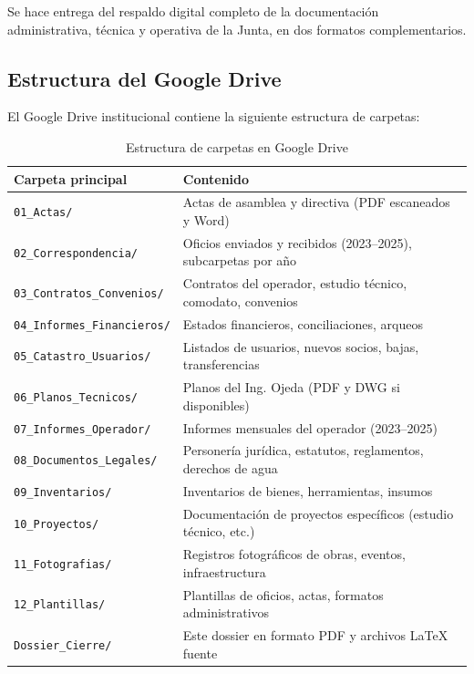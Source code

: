 Se hace entrega del respaldo digital completo de la documentación administrativa, técnica y operativa de la Junta, en dos formatos complementarios.

\subsection*{Estructura del Google Drive}

El Google Drive institucional contiene la siguiente estructura de carpetas:

\begin{table}[H]
\centering
\caption{Estructura de carpetas en Google Drive}
\label{tab:estructura-drive}
\begin{tabularx}{\textwidth}{@{}lX@{}}
\toprule
\textbf{Carpeta principal} & \textbf{Contenido} \\
\midrule
\texttt{01\_Actas/} & Actas de asamblea y directiva (PDF escaneados y Word) \\
\texttt{02\_Correspondencia/} & Oficios enviados y recibidos (2023--2025), subcarpetas por año \\
\texttt{03\_Contratos\_Convenios/} & Contratos del operador, estudio técnico, comodato, convenios \\
\texttt{04\_Informes\_Financieros/} & Estados financieros, conciliaciones, arqueos \\
\texttt{05\_Catastro\_Usuarios/} & Listados de usuarios, nuevos socios, bajas, transferencias \\
\texttt{06\_Planos\_Tecnicos/} & Planos del Ing. Ojeda (PDF y DWG si disponibles) \\
\texttt{07\_Informes\_Operador/} & Informes mensuales del operador (2023--2025) \\
\texttt{08\_Documentos\_Legales/} & Personería jurídica, estatutos, reglamentos, derechos de agua \\
\texttt{09\_Inventarios/} & Inventarios de bienes, herramientas, insumos \\
\texttt{10\_Proyectos/} & Documentación de proyectos específicos (estudio técnico, etc.) \\
\texttt{11\_Fotografias/} & Registros fotográficos de obras, eventos, infraestructura \\
\texttt{12\_Plantillas/} & Plantillas de oficios, actas, formatos administrativos \\
\texttt{Dossier\_Cierre/} & Este dossier en formato PDF y archivos LaTeX fuente \\
\bottomrule
\end{tabularx}
\end{table}

